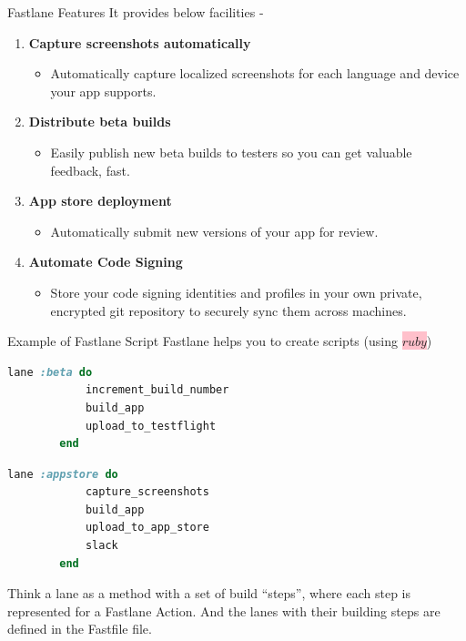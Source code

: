 \documentclass{beamer}
\begin{document}
\begin{frame}[t]{Fastlane Features}
    It provides below facilities - 
    \vspace{3pt}
    \begin{enumerate}
        \item \textbf{Capture screenshots automatically}
            \begin{itemize}
                \item Automatically capture localized screenshots for each language and device your app supports.
            \end{itemize}
        \item \textbf{Distribute beta builds}
            \begin{itemize}
                \item Easily publish new beta builds to testers so you can get valuable feedback, fast.
            \end{itemize}
        \item \textbf{App store deployment}
            \begin{itemize}
                \item Automatically submit new versions of your app for review.
            \end{itemize}
        \item \textbf{Automate Code Signing}
            \begin{itemize}
                \item Store your code signing identities and profiles in your own private, encrypted git repository to securely sync them across machines.
            \end{itemize}
    \end{enumerate}
\end{frame}

\begin{frame}[fragile]{Example of Fastlane Script}
    Fastlane helps you to create scripts (using \colorbox{pink}{$ruby$}) 
    \vspace{3pt}
    \begin{lstlisting}[language=Ruby]
      lane :beta do
		    increment_build_number
		    build_app
		    upload_to_testflight
	    end \end{lstlisting}
	
	
	\begin{lstlisting}[language=Ruby]
	    lane :appstore do
		    capture_screenshots
		    build_app
		    upload_to_app_store
		    slack
	    end \end{lstlisting}
	Think a lane as a method with a set of build “steps”, where each step is represented for a Fastlane Action. And the lanes with their building steps are defined in the Fastfile file.
\end{frame}
\end{document}
